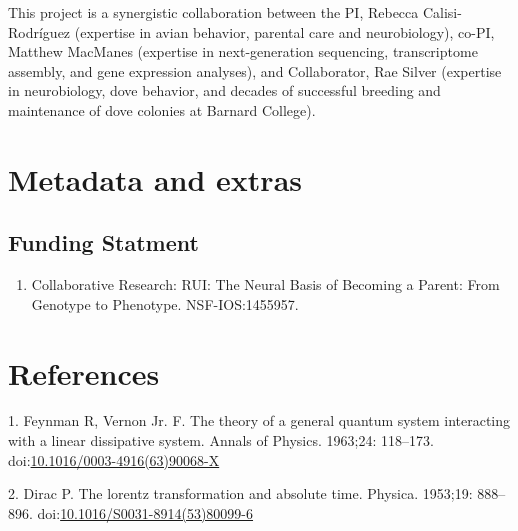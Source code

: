 \documentclass[10pt,letterpaper]{article}
\providecommand{\tightlist}{%
  \setlength{\itemsep}{0pt}\setlength{\parskip}{0pt}}
\begin{document}
This project is a synergistic collaboration between the PI, Rebecca
Calisi-Rodríguez (expertise in avian behavior, parental care and
neurobiology), co-PI, Matthew MacManes (expertise in next-generation
sequencing, transcriptome assembly, and gene expression analyses), and
Collaborator, Rae Silver (expertise in neurobiology, dove behavior, and
decades of successful breeding and maintenance of dove colonies at
Barnard College).

\hypertarget{metadata-and-extras}{%
\section{Metadata and extras}\label{metadata-and-extras}}

\hypertarget{funding-statment}{%
\subsection{Funding Statment}\label{funding-statment}}

\begin{enumerate}
\def\labelenumi{\arabic{enumi}.}
\tightlist
\item
  Collaborative Research: RUI: The Neural Basis of Becoming a Parent:
  From Genotype to Phenotype. NSF-IOS:1455957.
\end{enumerate}

\hypertarget{references}{%
\section*{References}\label{references}}

\hypertarget{refs}{}
\leavevmode\hypertarget{ref-Feynman1963118}{}%
1. Feynman R, Vernon Jr. F. The theory of a general quantum system
interacting with a linear dissipative system. Annals of Physics.
1963;24: 118--173.
doi:\href{https://doi.org/10.1016/0003-4916(63)90068-X}{10.1016/0003-4916(63)90068-X}

\leavevmode\hypertarget{ref-Dirac1953888}{}%
2. Dirac P. The lorentz transformation and absolute time. Physica.
1953;19: 888--896.
doi:\href{https://doi.org/10.1016/S0031-8914(53)80099-6}{10.1016/S0031-8914(53)80099-6}

\nolinenumbers
\end{document}

